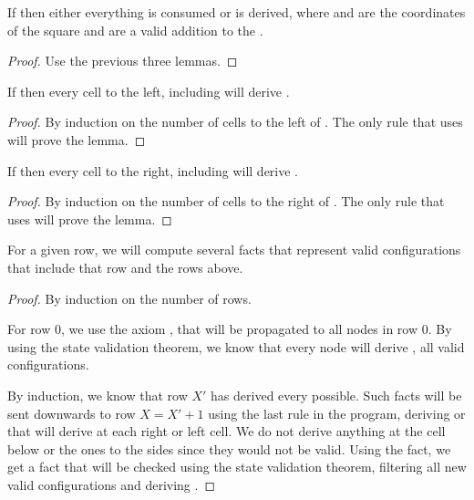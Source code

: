 \begin{theorem}
If  then either everything is consumed or  is derived, where  and  are the coordinates of the square and are a valid addition to the .
\end{theorem}
\begin{proof}
Use the previous three lemmas.
\end{proof}

\begin{lemma}
If  then every cell to the left, including  will derive .
\end{lemma}
\begin{proof}
By induction on the number of cells to the left of . The only rule that uses  will prove the lemma.
\end{proof}

\begin{lemma}
If  then every cell to the right, including  will derive .
\end{lemma}
\begin{proof}
By induction on the number of cells to the right of . The only rule that uses  will prove the lemma.
\end{proof}

\begin{theorem}
For a given row, we will compute several  facts that represent valid configurations that include that row and the rows above.
\end{theorem}
\begin{proof}
By induction on the number of rows.

For row 0, we use the axiom , that will be propagated to all nodes in row 0. By using the state validation theorem, we know that every node will derive , all valid configurations.


By induction, we know that row $X'$ has derived every  possible. Such facts will be sent downwards to row $X = X' + 1$ using the last rule in the program, deriving  or  that will derive  at each right or left cell. We do not derive anything at the cell below or the ones to the sides since they would not be valid. Using the  fact, we get a  fact that will be checked using the state validation theorem, filtering all new valid configurations and deriving .
\end{proof}

\clearpage
